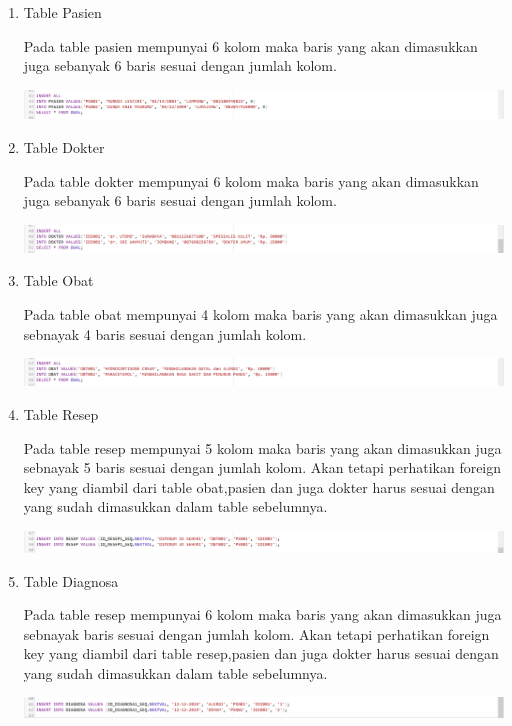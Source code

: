 \begin{enumerate}
\begin{enumerate}
        \item Table Pasien
        \par Pada table pasien mempunyai 6 kolom maka baris yang akan dimasukkan juga sebanyak 6 baris sesuai dengan jumlah kolom.
        \begin{center}
    \includegraphics[width=10cm\textwidth]{gambar/9.png}
    \end{center}
    \item Table Dokter
        \par Pada table dokter mempunyai 6 kolom maka baris yang akan dimasukkan juga sebanyak 6 baris sesuai dengan jumlah kolom.
        \begin{center}
    \includegraphics[width=10cm\textwidth]{gambar/10.png}
    \end{center}
    \item Table Obat
        \par Pada table obat mempunyai 4 kolom maka baris yang akan dimasukkan juga sebnayak 4 baris sesuai dengan jumlah kolom.
        \begin{center}
    \includegraphics[width=10cm\textwidth]{gambar/11.png}
    \end{center}
    \newpage
    \item Table Resep
        \par Pada table resep mempunyai 5 kolom maka baris yang akan dimasukkan juga sebnayak 5 baris sesuai dengan jumlah kolom. Akan tetapi perhatikan foreign key yang diambil dari table obat,pasien dan juga dokter harus sesuai dengan yang sudah dimasukkan dalam table sebelumnya.
        \begin{center}
    \includegraphics[width=10cm\textwidth]{gambar/12.png}
    \end{center}
    \item Table Diagnosa
        \par Pada table resep mempunyai 6 kolom maka baris yang akan dimasukkan juga sebnayak  baris sesuai dengan jumlah kolom. Akan tetapi perhatikan foreign key yang diambil dari table resep,pasien dan juga dokter harus sesuai dengan yang sudah dimasukkan dalam table sebelumnya.
        \begin{center}
    \includegraphics[width=10cm\textwidth]{gambar/13.png}
    \end{center}
    \end{enumerate}
    

\end{enumerate}
